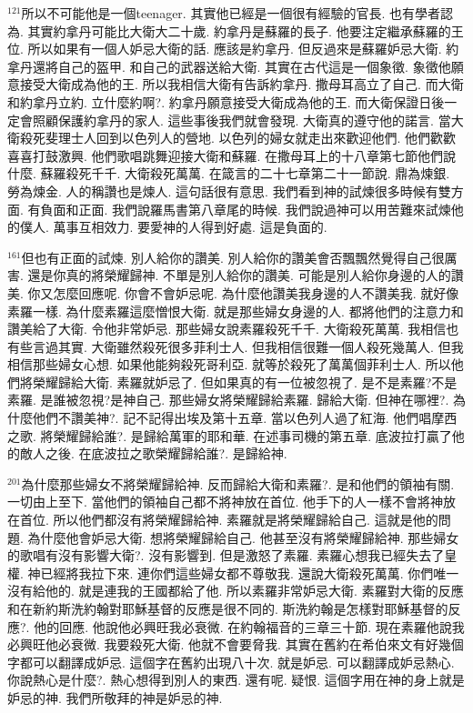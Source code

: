 \documentclass{book}
\begin{document}
$^{121}$所以不可能他是一個teenager.
其實他已經是一個很有經驗的官長.
也有學者認為.
其實約拿丹可能比大衛大二十歲.
約拿丹是蘇羅的長子.
他要注定繼承蘇羅的王位.
所以如果有一個人妒忌大衛的話.
應該是約拿丹.
但反過來是蘇羅妒忌大衛.
約拿丹還將自己的盔甲.
和自己的武器送給大衛.
其實在古代這是一個象徵.
象徵他願意接受大衛成為他的王.
所以我相信大衛有告訴約拿丹.
撒母耳高立了自己.
而大衛和約拿丹立約.
立什麼約啊?.
約拿丹願意接受大衛成為他的王.
而大衛保證日後一定會照顧保護約拿丹的家人.
這些事後我們就會發現.
大衛真的遵守他的諾言.
當大衛殺死斐理士人回到以色列人的營地.
以色列的婦女就走出來歡迎他們.
他們歡歡喜喜打鼓激興.
他們歌唱跳舞迎接大衛和蘇羅.
在撒母耳上的十八章第七節他們說什麼.
蘇羅殺死千千.
大衛殺死萬萬.
在箴言的二十七章第二十一節說.
鼎為煉銀.
勞為煉金.
人的稱讚也是煉人.
這句話很有意思.
我們看到神的試煉很多時候有雙方面.
有負面和正面.
我們說羅馬書第八章尾的時候.
我們說過神可以用苦難來試煉他的僕人.
萬事互相效力.
要愛神的人得到好處.
這是負面的.

$^{161}$但也有正面的試煉.
別人給你的讚美.
別人給你的讚美會否飄飄然覺得自己很厲害.
還是你真的將榮耀歸神.
不單是別人給你的讚美.
可能是別人給你身邊的人的讚美.
你又怎麼回應呢.
你會不會妒忌呢.
為什麼他讚美我身邊的人不讚美我.
就好像素羅一樣.
為什麼素羅這麼憎恨大衛.
就是那些婦女身邊的人.
都將他們的注意力和讚美給了大衛.
令他非常妒忌.
那些婦女說素羅殺死千千.
大衛殺死萬萬.
我相信也有些言過其實.
大衛雖然殺死很多菲利士人.
但我相信很難一個人殺死幾萬人.
但我相信那些婦女心想.
如果他能夠殺死哥利亞.
就等於殺死了萬萬個菲利士人.
所以他們將榮耀歸給大衛.
素羅就妒忌了.
但如果真的有一位被忽視了.
是不是素羅?不是素羅.
是誰被忽視?是神自己.
那些婦女將榮耀歸給素羅.
歸給大衛.
但神在哪裡?.
為什麼他們不讚美神?.
記不記得出埃及第十五章.
當以色列人過了紅海.
他們唱摩西之歌.
將榮耀歸給誰?.
是歸給萬軍的耶和華.
在述事司機的第五章.
底波拉打贏了他的敵人之後.
在底波拉之歌榮耀歸給誰?.
是歸給神.

$^{201}$為什麼那些婦女不將榮耀歸給神.
反而歸給大衛和素羅?.
是和他們的領袖有關.
一切由上至下.
當他們的領袖自己都不將神放在首位.
他手下的人一樣不會將神放在首位.
所以他們都沒有將榮耀歸給神.
素羅就是將榮耀歸給自己.
這就是他的問題.
為什麼他會妒忌大衛.
想將榮耀歸給自己.
他甚至沒有將榮耀歸給神.
那些婦女的歌唱有沒有影響大衛?.
沒有影響到.
但是激怒了素羅.
素羅心想我已經失去了皇權.
神已經將我拉下來.
連你們這些婦女都不尊敬我.
還說大衛殺死萬萬.
你們唯一沒有給他的.
就是連我的王國都給了他.
所以素羅非常妒忌大衛.
素羅對大衛的反應和在新約斯洗約翰對耶穌基督的反應是很不同的.
斯洗約翰是怎樣對耶穌基督的反應?.
他的回應.
他說他必興旺我必衰微.
在約翰福音的三章三十節.
現在素羅他說我必興旺他必衰微.
我要殺死大衛.
他就不會要脅我.
其實在舊約在希伯來文有好幾個字都可以翻譯成妒忌.
這個字在舊約出現八十次.
就是妒忌.
可以翻譯成妒忌熱心.
你說熱心是什麼?.
熱心想得到別人的東西.
還有呢.
疑恨.
這個字用在神的身上就是妒忌的神.
我們所敬拜的神是妒忌的神.
\end{document}
